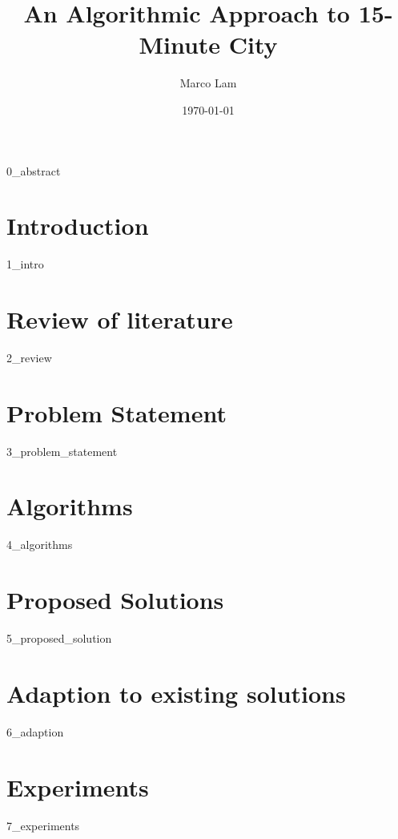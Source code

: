 \documentclass[oneside]{book}
\title{An Algorithmic Approach to 15-Minute City}
\author{Marco Lam}
\date{\today}
\begin{document}
\maketitle

{0_abstract}

\newpage

\tableofcontents
\listoftables
\listofalgorithms
\newpage

\chapter{Introduction}

{1_intro}

\newpage

\chapter{Review of literature} \label{review}

{2_review}

\newpage

\chapter{Problem Statement}

{3_problem_statement}

\newpage

\chapter{Algorithms}

{4_algorithms}

\newpage

\chapter{Proposed Solutions}

{5_proposed_solution}

\newpage

\chapter{Adaption to existing solutions}

{6_adaption}

\newpage

\chapter{Experiments}

{7_experiments}

\newpage


\end{document}
